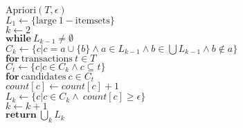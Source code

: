 \indent \begin{math}\mathrm{Apriori}(T,\epsilon)\end{math}\\
\indent\indent \begin{math}L_1 \gets \{ \mathrm{large~1-itemsets} \} \end{math}\\
\indent\indent \begin{math}k \gets 2\end{math}\\
\indent\indent\indent \begin{math}\mathrm{\textbf{while}}~ L_{k-1} \neq \emptyset \end{math}\\
\indent\indent\indent\indent \begin{math}C_k \gets \{ c |c = a \cup \{b\}  \land  a \in L_{k-1} \land b \in \bigcup L_{k-1} \land b \not \in  a  \}\end{math}\\
\indent\indent\indent\indent \begin{math}\mathrm{\textbf{for}~transactions}~t \in T\end{math}\\
\indent\indent\indent\indent\indent \begin{math}C_t \gets \{ c | c \in C_k \land c \subseteq t \} \end{math}\\
\indent\indent\indent\indent\indent \begin{math}\mathrm{\textbf{for}~candidates}~c \in C_t\end{math}\\
\indent\indent\indent\indent\indent\indent \begin{math}count[c] \gets count[c]+1\end{math}\\
\indent\indent\indent\indent \begin{math}L_k \gets \{ c |c \in C_k \land ~ count[c] \geq \epsilon \}\end{math}\\
\indent\indent\indent\indent \begin{math}k \gets k+1\end{math}\\
\indent\indent\indent \begin{math}\mathrm{\textbf{return}}~\bigcup_k L_k\end{math}\\

